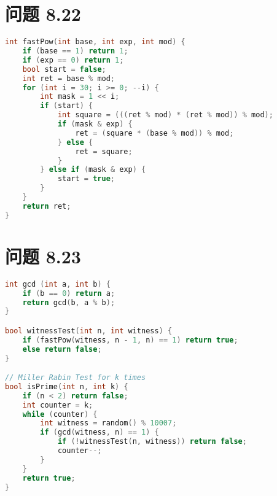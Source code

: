 \documentclass[acmlarge,screen]{acmart}
\begin{document}
\section{问题 8.22}
\begin{lstlisting}[language=C++]
int fastPow(int base, int exp, int mod) {
    if (base == 1) return 1;
    if (exp == 0) return 1;
    bool start = false;
    int ret = base % mod;
    for (int i = 30; i >= 0; --i) {
        int mask = 1 << i;
        if (start) {
            int square = (((ret % mod) * (ret % mod)) % mod);
            if (mask & exp) {
                ret = (square * (base % mod)) % mod;
            } else {
                ret = square;
            }
        } else if (mask & exp) {
            start = true;
        }
    }
    return ret;
}
\end{lstlisting}
\section{问题 8.23}
\begin{lstlisting}[language=C++]
int gcd (int a, int b) {
    if (b == 0) return a;
    return gcd(b, a % b);
}

bool witnessTest(int n, int witness) {
    if (fastPow(witness, n - 1, n) == 1) return true;
    else return false;
}

// Miller Rabin Test for k times
bool isPrime(int n, int k) {
    if (n < 2) return false;
    int counter = k;
    while (counter) {
        int witness = random() % 10007;
        if (gcd(witness, n) == 1) {
            if (!witnessTest(n, witness)) return false;
            counter--;
        }
    }
    return true;
}
\end{lstlisting}
\end{document}
